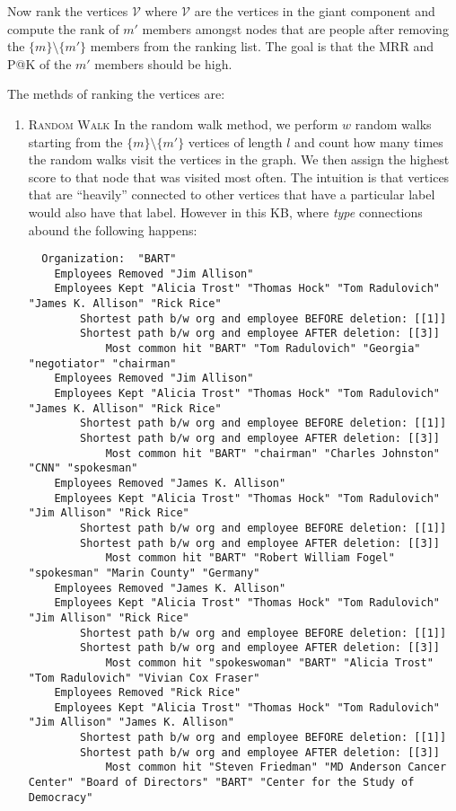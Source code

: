 \documentclass{tufte-handout}
\begin{document}
Now rank the vertices $\mathcal{V}$ where $\mathcal{V}$ are the
vertices in the giant component and compute the rank of $m'$ members
amongst nodes that are people after removing the $\{m\} \setminus \{m'\}$
members from the ranking list. The goal is that the MRR and P@K of the $m'$
members should be high.

The methds of ranking the vertices are:
\begin{enumerate}
\item \textsc{Random Walk} In the random walk method, we perform
  $w$ random walks starting
  from the $\{m\} \setminus \{m'\}$ vertices of length $l$ and count how many
  times the random walks visit the vertices in the graph. We then assign the
  highest score to that node that was visited most often. The intuition is that
  vertices that are ``heavily'' connected to other vertices that have a particular
  label would also have that label.
  However in this KB, where \textit{type} connections abound the following happens:
  \begin{verbatim}
  Organization:  "BART"
    Employees Removed "Jim Allison"
    Employees Kept "Alicia Trost" "Thomas Hock" "Tom Radulovich" "James K. Allison" "Rick Rice"
        Shortest path b/w org and employee BEFORE deletion: [[1]]
        Shortest path b/w org and employee AFTER deletion: [[3]]
            Most common hit "BART" "Tom Radulovich" "Georgia" "negotiator" "chairman"
    Employees Removed "Jim Allison"
    Employees Kept "Alicia Trost" "Thomas Hock" "Tom Radulovich" "James K. Allison" "Rick Rice"
        Shortest path b/w org and employee BEFORE deletion: [[1]]
        Shortest path b/w org and employee AFTER deletion: [[3]]
            Most common hit "BART" "chairman" "Charles Johnston" "CNN" "spokesman"
    Employees Removed "James K. Allison"
    Employees Kept "Alicia Trost" "Thomas Hock" "Tom Radulovich" "Jim Allison" "Rick Rice"
        Shortest path b/w org and employee BEFORE deletion: [[1]]
        Shortest path b/w org and employee AFTER deletion: [[3]]
            Most common hit "BART" "Robert William Fogel" "spokesman" "Marin County" "Germany"
    Employees Removed "James K. Allison"
    Employees Kept "Alicia Trost" "Thomas Hock" "Tom Radulovich" "Jim Allison" "Rick Rice"
        Shortest path b/w org and employee BEFORE deletion: [[1]]
        Shortest path b/w org and employee AFTER deletion: [[3]]
            Most common hit "spokeswoman" "BART" "Alicia Trost" "Tom Radulovich" "Vivian Cox Fraser"
    Employees Removed "Rick Rice"
    Employees Kept "Alicia Trost" "Thomas Hock" "Tom Radulovich" "Jim Allison" "James K. Allison"
        Shortest path b/w org and employee BEFORE deletion: [[1]]
        Shortest path b/w org and employee AFTER deletion: [[3]]
            Most common hit "Steven Friedman" "MD Anderson Cancer Center" "Board of Directors" "BART" "Center for the Study of Democracy"
\end{verbatim}


\end{enumerate}
\end{document}
